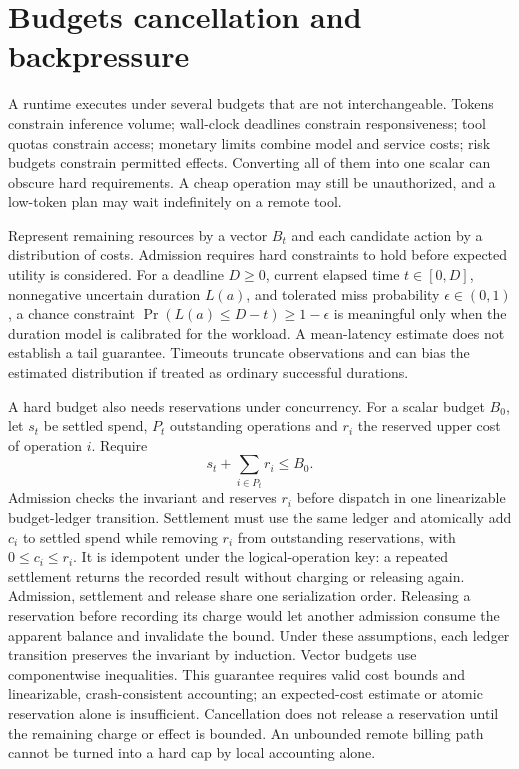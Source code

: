 \section{Budgets cancellation and backpressure}\label{sec:C20:budgets}
A runtime executes under several budgets that are not interchangeable. Tokens constrain inference volume; wall-clock deadlines constrain responsiveness; tool quotas constrain access; monetary limits combine model and service costs; risk budgets constrain permitted effects. Converting all of them into one scalar can obscure hard requirements. A cheap operation may still be unauthorized, and a low-token plan may wait indefinitely on a remote tool.

Represent remaining resources by a vector $B_t$ and each candidate action by a distribution of costs. Admission requires hard constraints to hold before expected utility is considered. For a deadline $D\geq0$, current elapsed time $t\in[0,D]$, nonnegative uncertain duration $L(a)$, and tolerated miss probability $\epsilon\in(0,1)$, a chance constraint $\Pr(L(a)\leq D-t)\geq1-\epsilon$ is meaningful only when the duration model is calibrated for the workload. A mean-latency estimate does not establish a tail guarantee. Timeouts truncate observations and can bias the estimated distribution if treated as ordinary successful durations.

A hard budget also needs reservations under concurrency. For a scalar budget $B_0$, let $s_t$ be settled spend, $P_t$ outstanding operations and $r_i$ the reserved upper cost of operation $i$. Require
\begin{equation}
 s_t+\sum_{i\in P_t}r_i\leq B_0.
\end{equation}
Admission checks the invariant and reserves $r_i$ before dispatch in one linearizable budget-ledger transition. Settlement must use the same ledger and atomically add $c_i$ to settled spend while removing $r_i$ from outstanding reservations, with $0\leq c_i\leq r_i$. It is idempotent under the logical-operation key: a repeated settlement returns the recorded result without charging or releasing again. Admission, settlement and release share one serialization order. Releasing a reservation before recording its charge would let another admission consume the apparent balance and invalidate the bound. Under these assumptions, each ledger transition preserves the invariant by induction. Vector budgets use componentwise inequalities. This guarantee requires valid cost bounds and linearizable, crash-consistent accounting; an expected-cost estimate or atomic reservation alone is insufficient. Cancellation does not release a reservation until the remaining charge or effect is bounded. An unbounded remote billing path cannot be turned into a hard cap by local accounting alone.

